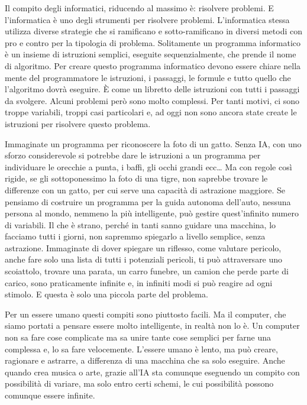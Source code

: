 \documentclass[12pt]{book} %
\begin{document}
Il compito degli informatici, riducendo al massimo è: risolvere problemi. E l'informatica è uno
degli strumenti per risolvere problemi. L'informatica stessa utilizza diverse strategie che si
ramificano e sotto-ramificano in diversi metodi con pro e contro per la tipologia di problema. Solitamente un programma
informatico è un insieme di istruzioni semplici, eseguite sequenzialmente, che prende il nome di algoritmo. Per creare
questo programma informatico devono essere chiare nella mente del programmatore le istruzioni, i passaggi, le formule e
tutto quello che l'algoritmo dovrà eseguire. È come un libretto delle istruzioni con tutti i
passaggi da svolgere. Alcuni problemi però sono molto complessi. Per tanti motivi, ci sono troppe variabili, troppi
casi particolari e, ad oggi non sono ancora state create le istruzioni per risolvere questo problema. 

Immaginate un programma per riconoscere la foto di un gatto. Senza IA, con uno sforzo considerevole si potrebbe dare le
istruzioni a un programma per individuare le orecchie a punta, i baffi, gli occhi grandi ecc… Ma con regole così
rigide, se gli sottoponessimo la foto di una tigre, non saprebbe trovare le differenze con un gatto, per cui serve una
capacità di astrazione maggiore. Se pensiamo di costruire un programma per la guida autonoma
dell'auto, nessuna persona al mondo, nemmeno la più intelligente, può gestire
quest'infinito numero di variabili. Il che è strano, perché in tanti sanno guidare una macchina,
lo facciamo tutti i giorni, non sapremmo spiegarlo a livello semplice, senza astrazione. Immaginate di dover spiegare
un riflesso, come valutare pericolo, anche fare solo una lista di tutti i potenziali pericoli, ti può attraversare uno
scoiattolo, trovare una parata, un carro funebre, un camion che perde parte di carico, sono praticamente infinite e, in
infiniti modi si può reagire ad ogni stimolo. E questa è solo una piccola parte del problema. 

Per un essere umano questi compiti sono piuttosto facili. Ma il computer, che siamo portati a pensare essere molto
intelligente, in realtà non lo è. Un computer non sa fare cose complicate ma sa unire tante cose semplici per farne una
complessa e, lo sa fare velocemente. L'essere umano è lento, ma può creare, ragionare e astrarre,
a differenza di una macchina che sa solo eseguire. Anche quando crea musica o arte, grazie all'IA
sta comunque eseguendo un compito con possibilità di variare, ma solo entro certi schemi, le cui possibilità possono
comunque essere infinite.
\end{document}
